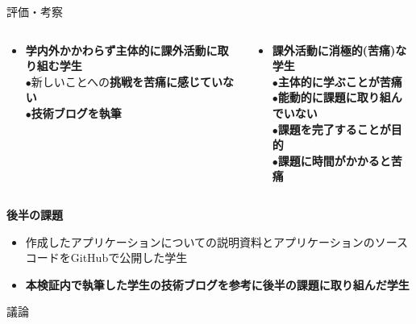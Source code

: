\documentclass[final,dvipdfmx]{beamer}
\begin{document}
\begin{columns}[T]
\begin{column}{.49\linewidth}
\begin{block}{評価・考察}
\begin{screen}
				\begin{columns}
					\begin{column}{0.5\textwidth}
						\begin{itemize}
							\item \textbf{学内外かかわらず主体的に課外活動に取り組む学生}\\$\bullet$新しいことへの\textbf{挑戦を苦痛に感じていない}\\$\bullet$\textbf{技術ブログを執筆}
						\end{itemize}
					\end{column}
					\begin{column}{0.5\textwidth}
						\begin{itemize} 
							\item \textbf{課外活動に消極的(苦痛)な学生}\\$\bullet$\textbf{主体的に学ぶことが苦痛}\\$\bullet$\textbf{能動的に課題に取り組んでいない\\$\bullet$\textbf{課題を完了することが目的}}\\$\bullet$\textbf{課題に時間がかかると苦痛}
						\end{itemize}
					\end{column} 
				\end{columns}
				
			\end{screen} 
			
			\begin{screen}
				\textbf{\large{後半の課題}}
				\begin{itemize}
					\item 作成したアプリケーションについての説明資料とアプリケーションのソースコードをGitHubで公開した学生
					\item \textbf{本検証内で執筆した学生の技術ブログを参考に後半の課題に取り組んだ学生}
				\end{itemize} 
				       
			\end{screen}
						
		\end{block}
				
		\begin{block}{議論}
			
			\begin{columns}
				

\end{columns}
\end{block}
\end{column}
\end{columns}
\end{document}
